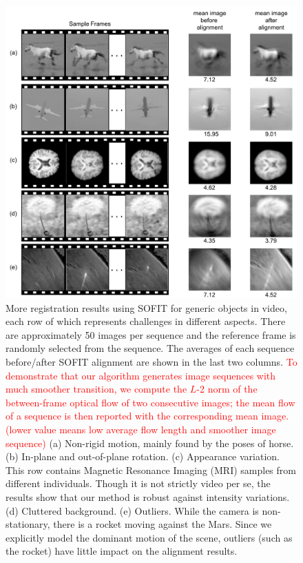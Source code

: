 \documentclass[10pt,journal]{IEEEtran}
\newcommand{\Songfan}[1]{\textcolor{red}{#1}}
\begin{document}
\begin{figure}[htbp]
	\centering
		\includegraphics[width=.65\textwidth]{fig/object_ex}
	\caption{More registration results using SOFIT for generic objects in video, each row of which represents challenges in different aspects. There are approximately 50 images per sequence and the reference frame is randomly selected from the sequence. The averages of each sequence before/after SOFIT alignment are shown in the last two columns. \Songfan{
To demonstrate that our algorithm generates image sequences with much smoother transition, we compute the $L$-2 norm of the between-frame optical flow of two consecutive images; the mean flow of a sequence is then reported with the corresponding mean image. (lower value means low average flow length and smoother image sequence)} (a) Non-rigid motion, mainly found by the poses of horse. (b) In-plane and out-of-plane rotation. (c) Appearance variation. This row contains Magnetic Resonance Imaging (MRI) samples from different individuals. Though it is not strictly video per se, the results show that our method is robust against intensity variations. (d) Cluttered background. (e) Outliers. While the camera is non-stationary, there is a rocket moving against the Mars. Since we explicitly model the dominant motion of the scene, outliers (such as the rocket) have little impact on the alignment results.}
	\label{fig:object_ex}
\end{figure}
\end{document}
